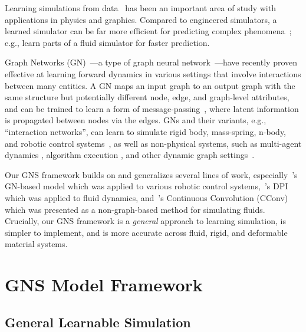 \documentclass{article}
\begin{document}
%
Learning simulations from data~\cite{grzeszczuk1998neuroanimator} has been an important area of study with applications in physics and graphics. Compared to engineered simulators, a learned simulator can be far more efficient for predicting complex phenomena~\cite{he2019learning}; e.g., \cite{ladicky2015data,wiewel2019latent} learn parts of a fluid simulator for faster prediction.

Graph Networks (GN)~\cite{battaglia2018relational}---a type of graph neural network~\cite{scarselli2008graph}---have recently proven effective at learning forward dynamics in various settings that involve interactions between many entities. A GN maps an input graph to an output graph with the same structure but potentially different node, edge, and graph-level attributes, and can be trained to learn a form of message-passing~\cite{gilmer2017neural}, where latent information is propagated between nodes via the edges. GNs and their variants, e.g., ``interaction networks'', can learn to simulate rigid body, mass-spring, n-body, and robotic control systems~\cite{battaglia2016interaction,chang2016compositional,sanchez2018graph,mrowca2018flexible,li2019propagation,sanchez2019hamiltonian}, as well as non-physical systems, such as multi-agent dynamics \cite{tacchetti2018relational,sun2019stochastic}, algorithm execution \cite{velickovic2020Neural}, and other dynamic graph settings~\cite{trivedi2018dyrep,trivedi2017know,yan2018spatial,manessi2020dynamic}. 

Our GNS framework builds on and generalizes several lines of work, especially~\citet{sanchez2018graph}'s GN-based model which was applied to various robotic control systems,~\citet{li2018learning}'s DPI which was applied to fluid dynamics, and~\citet{ummenhofer2020lagrangian}'s Continuous Convolution (CConv) which was presented as a non-graph-based method for simulating fluids. Crucially, our GNS framework is a \textit{general} approach to learning simulation, is simpler to implement, and is more accurate across fluid, rigid, and deformable material systems.
 
%
\section{GNS Model Framework}
\label{sec:model}

%


\subsection{General Learnable Simulation}
\label{sec:model:general}
\end{document}
